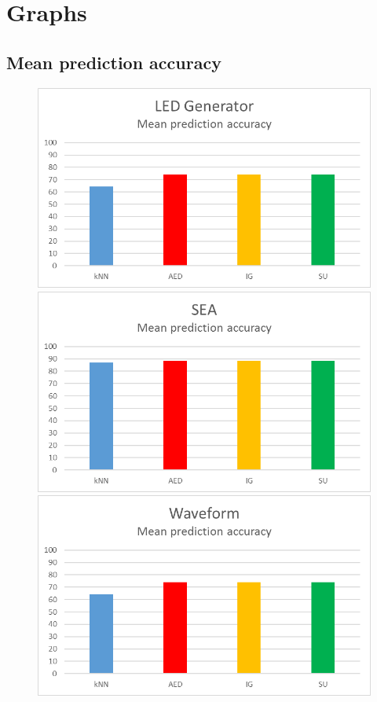 \chapter{Graphs}
\label{Appendix:Graphs}

\section{Mean prediction accuracy}

\begin{figure}[hp]
\centering
\includegraphics[scale=0.17]{Graphs/LED/10_bar}
\includegraphics[scale=0.17]{Graphs/SEA/bar}
\includegraphics[scale=0.17]{Graphs/Waveform/bar}

\end{figure}
